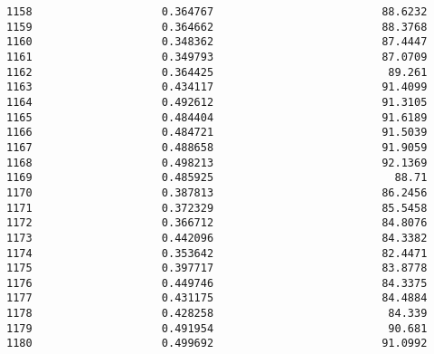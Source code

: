 \documentclass[11pt]{article}
\begin{document}
\begin{tcolorbox}[breakable, size=fbox, boxrule=.5pt, pad at break*=1mm, opacityfill=0]
\begin{Verbatim}[commandchars=\\\{\}]
1158                    0.364767                          88.6232
1159                    0.364662                          88.3768
1160                    0.348362                          87.4447
1161                    0.349793                          87.0709
1162                    0.364425                           89.261
1163                    0.434117                          91.4099
1164                    0.492612                          91.3105
1165                    0.484404                          91.6189
1166                    0.484721                          91.5039
1167                    0.488658                          91.9059
1168                    0.498213                          92.1369
1169                    0.485925                            88.71
1170                    0.387813                          86.2456
1171                    0.372329                          85.5458
1172                    0.366712                          84.8076
1173                    0.442096                          84.3382
1174                    0.353642                          82.4471
1175                    0.397717                          83.8778
1176                    0.449746                          84.3375
1177                    0.431175                          84.4884
1178                    0.428258                           84.339
1179                    0.491954                           90.681
1180                    0.499692                          91.0992


\end{Verbatim}
\end{tcolorbox}
\end{document}
